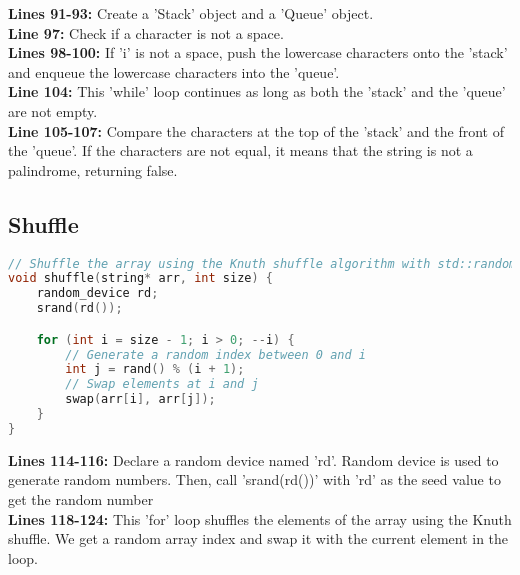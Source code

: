 \documentclass[letterpaper, 10pt,DIV=13]{scrartcl}
\numberwithin{equation}{section} %
\numberwithin{figure}{section} %
\numberwithin{table}{section} %
\begin{document}
\textbf{Lines 91-93:} Create a 'Stack' object and a 'Queue' object. \\
\textbf{Line 97:} Check if a character is not a space. \\
\textbf{Lines 98-100:} If 'i' is not a space, push the lowercase characters onto the 'stack' and enqueue the lowercase characters into the 'queue'. \\
\textbf{Line 104:} This 'while' loop continues as long as both the 'stack' and the 'queue' are not empty. \\
\textbf{Line 105-107:} Compare the characters at the top of the 'stack' and the front of the 'queue'. If the characters are not equal, it means that the string is not a palindrome, returning false.

\subsection{Shuffle}
\begin{linenumbers}
\begin{lstlisting}[language=C++, caption={Shuffle}, label={code:example}]
// Shuffle the array using the Knuth shuffle algorithm with std::random_device seeding
void shuffle(string* arr, int size) {
    random_device rd;
    srand(rd());

    for (int i = size - 1; i > 0; --i) {
        // Generate a random index between 0 and i
        int j = rand() % (i + 1); 
        // Swap elements at i and j
        swap(arr[i], arr[j]);     
    }
}
\end{lstlisting}
\end{linenumbers}
\nolinenumbers

\textbf{Lines 114-116:} Declare a random device named 'rd'. Random device is used to generate random numbers. Then, call 'srand(rd())' with 'rd' as the seed value to get the random number \\
\textbf{Lines 118-124:} This 'for' loop shuffles the elements of the array using the Knuth shuffle. We get a random array index and swap it with the current element in the loop.


\pagebreak

\end{document}
